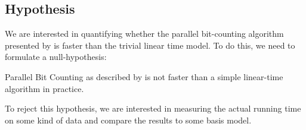 \subsection{Hypothesis}
We are interested in quantifying whether the parallel bit-counting algorithm presented by \citet{fast-similarity-search} is faster than the trivial linear time model. To do this, we need to formulate a null-hypothesis:
\begin{hypothesis}
    Parallel Bit Counting as described by \citet{fast-similarity-search} is not faster than a simple linear-time algorithm in practice.
\end{hypothesis}
To reject this hypothesis, we are interested in measuring the actual running time on some kind of data and compare the results to some basis model. %

